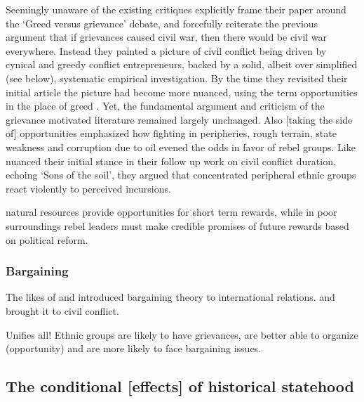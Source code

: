 Seemingly unaware of the existing critiques \citet{Collier2004} explicitly frame
their paper around the `Greed versus grievance' debate, and forcefully reiterate
the previous argument that if grievances caused civil war, then there would be
civil war everywhere. Instead they painted a picture of civil conflict being
driven by cynical and greedy conflict entrepreneurs, backed by a solid, albeit
over simplified (see below), systematic empirical investigation. By the time
they revisited their initial article the picture had become more nuanced, using
the term opportunities in the place of greed \citep{Collier2009}. Yet, the
fundamental argument and criticism of the grievance motivated literature
remained largely unchanged. Also [taking the side of] opportunities
\citet{Fearon2003} emphasized how fighting in peripheries, rough terrain, state
weakness and corruption due to oil evened the odds in favor of rebel groups.
Like \citet{Collier2009} \citet{Fearon_2004} nuanced their initial stance in
their follow up work on civil conflict duration, echoing
\citet{WeinerMyron1978SotS} `Sons of the soil', they argued that concentrated
peripheral ethnic groups react violently to perceived incursions.

\citet{Weinstein_2005} natural resources provide opportunities for short term
rewards, while in poor surroundings rebel leaders must make credible promises of
future rewards based on political reform.

\subsubsection{Bargaining} \label{Bargaining}

The likes of \citet{Fearon1995} and \citet{Powell2006} introduced bargaining
theory to international relations. \citet{WalterBarbaraF2002CtPT, Walter2006,
Walter2009} and \citet{Cunningham2006, Cunningham2013c, Cunningham_2013} brought
it to civil conflict.

\citep{Buhaug2009, Cunningham2006, Cunningham2013c, Cunningham_2013, Walter2006,
Walter2009}

\citet{Denny2014} Unifies all! Ethnic groups are likely to have grievances, are
better able to organize (opportunity) and are more likely to face bargaining
issues.

\subsection{The conditional [effects] of historical statehood}
\label{The conditional [effects] of historical statehood}

